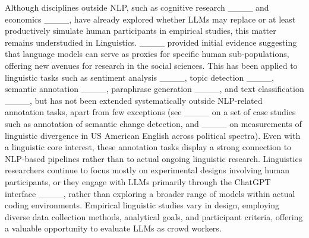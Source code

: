 Although disciplines outside NLP, such as cognitive research ____ and economics ____, have already explored whether LLMs may replace or at least productively simulate human participants in empirical studies, this matter remains understudied in Linguistics. ____ provided initial evidence suggesting that language models can serve as proxies for specific human sub-populations, offering new avenues for research in the social sciences. This has been applied to linguistic tasks such as sentiment analysis ____, topic detection ____, semantic annotation ____, paraphrase generation ____, and text classification ____, but has not been extended systematically outside NLP-related annotation tasks, apart from few exceptions (see ____ on a set of case studies such as annotation of semantic change detection, and ____ on measurements of linguistic divergence in US American English across political spectra). Even with a linguistic core interest, these annotation tasks display a strong connection to NLP-based pipelines rather than to actual ongoing linguistic research. Linguistics researchers continue to focus mostly on experimental designs involving human participants, or they engage with LLMs primarily through the ChatGPT interface ____, rather than exploring a broader range of models within actual coding environments. Empirical linguistic studies vary in design, employing diverse data collection methods, analytical goals, and participant criteria, offering a valuable opportunity to evaluate LLMs as crowd workers.